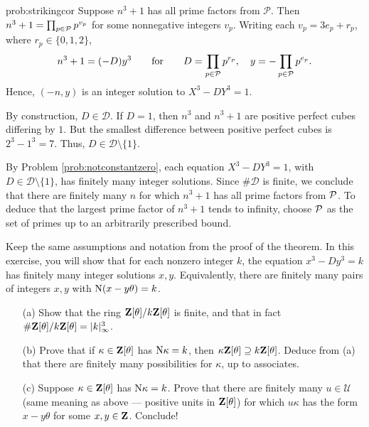 \begin{sol}{prob:strikingcor} Suppose $n^3+1$ has all prime factors from $\mathcal{P}$. Then $n^3+1 = \prod_{p \in \mathcal{P}} p^{v_p}$ for some nonnegative integers $v_p$. Writing each $v_p = 3e_p +r_p$, where $r_p \in \{0,1,2\}$, 
\[ n^3+1 = (-D)y^3 \qquad\text{for}\qquad D =\prod_{p\in \mathcal{P}} p^{r_p}, \quad y = -\prod_{p\in\mathcal{P}}p^{e_p}. \] 
Hence, $(-n,y)$ is an integer solution to $X^3-DY^3=1$. 

By construction, $D\in \mathcal{D}$. If $D=1$, then $n^3$ and $n^3+1$ are positive perfect cubes differing by $1$. But the smallest difference between positive perfect cubes is $2^3-1^3=7$. Thus, $D \in \mathcal{D}\setminus \{1\}$.

By Problem \ref{prob:notconstantzero}, each equation $X^3-DY^3=1$, with $D \in \mathcal{D}\setminus \{1\}$, has finitely many integer solutions. Since $\#\mathcal{D}$ is finite, we conclude that there are finitely many $n$ for which $n^3+1$ has all prime factors from $\mathcal{P}$. To deduce that the largest prime factor of $n^3+1$ tends to infinity, choose $\mathcal{P}$ as the set of primes up to an arbitrarily prescribed bound.
\end{sol}


\begin{challenge} Keep the same assumptions and notation from the proof of the theorem. In this exercise, you will show that for each nonzero integer $k$, the equation $x^3-Dy^3=k$ has finitely many integer solutions $x,y$. Equivalently, there are finitely many pairs of integers $x,y$ with $\mathrm{N}(x-y\theta)=k$.
\vspace{-0.12in}
\begin{enumerate}
\item[(a)] Show that the ring $\mathbf{Z}[\theta]/k\mathbf{Z}[\theta]$ is finite, and that in fact $\#\mathbf{Z}[\theta]/k\mathbf{Z}[\theta] = |k|_{\infty}^3$.
\item[(b)] Prove that if $\kappa \in \mathbf{Z}[\theta]$ has $\mathrm{N}\kappa=k$, then $\kappa \mathbf{Z}[\theta] \supseteq k\mathbf{Z}[\theta]$. Deduce from (a) that there are finitely many possibilities for $\kappa$, up to associates. 
\item[(c)] Suppose $\kappa \in \mathbf{Z}[\theta]$ has $\mathrm{N}\kappa=k$. Prove that there  are finitely many $u \in \mathcal{U}$ (same meaning as above --- positive units in $\mathbf{Z}[\theta]$) for which $u\kappa$ has the form $x-y\theta$ for some $x,y \in \mathbf{Z}$. Conclude!
\end{enumerate}
\end{challenge}

